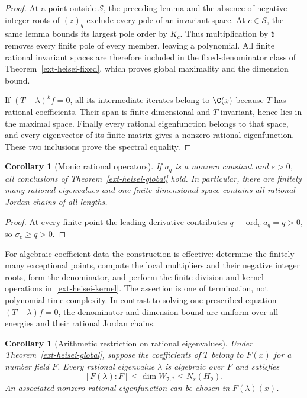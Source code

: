 \documentclass[11pt,a4paper]{article}
\newtheorem{corollary}[theorem]{Corollary}
\theoremstyle{definition}\newtheorem{definition}[theorem]{Definition}
\theoremstyle{remark}\newtheorem{remark}[theorem]{Remark}
\numberwithin{equation}{section}
\begin{document}
\begin{proof}
At a point outside $\mathcal S$, the preceding lemma and the absence of
negative integer roots of $(z)_q$ exclude every pole of an invariant
space.  At $c\in\mathcal S$, the same lemma bounds its largest pole order
by $K_c$.  Thus multiplication by $\mathfrak d$ removes every finite pole
of every member, leaving a polynomial.  All finite rational invariant
spaces are therefore included in the fixed-denominator class of
Theorem~\ref{ext-heisei-fixed}, which proves global maximality and the
dimension bound.

If $(T-\lambda)^k f=0$, all its intermediate iterates belong to $\C(x)$
because $T$ has rational coefficients.  Their span is finite-dimensional
and $T$-invariant, hence lies in the maximal space.  Finally every rational
eigenfunction belongs to that space, and every eigenvector of its finite
matrix gives a nonzero rational eigenfunction.  These two inclusions prove
the spectral equality.
\end{proof}

\begin{corollary}[Monic rational operators]
\label{ext-heisei-monic}
If $a_q$ is a nonzero constant and $s>0$, all conclusions of
Theorem~\ref{ext-heisei-global} hold.  In particular, there are finitely
many rational eigenvalues and one finite-dimensional space contains all
rational Jordan chains of all lengths.
\end{corollary}

\begin{proof}
At every finite point the leading derivative contributes
$q-\operatorname{ord}_c a_q=q>0$, so $\sigma_c\ge q>0$.
\end{proof}

For algebraic coefficient data the construction is effective: determine the
finitely many exceptional points, compute the local multipliers and their
negative integer roots, form the denominator, and perform the finite
division and kernel operations in~\eqref{ext-heisei-kernel}.  The assertion
is one of termination, not polynomial-time complexity.  In contrast to
solving one prescribed equation $(T-\lambda)f=0$, the denominator and
dimension bound are uniform over all energies and their rational Jordan
chains.

\begin{corollary}[Arithmetic restriction on rational eigenvalues]
\label{ext-heisei-arithmetic}
Under Theorem~\ref{ext-heisei-global}, suppose the coefficients of $T$
belong to $F(x)$ for a number field $F$.  Every rational eigenvalue
$\lambda$ is algebraic over $F$ and satisfies
\[
 [F(\lambda):F]\le \dim W_{\mathfrak d,*}
       \le N_s(H_{\mathfrak d}).
\]
An associated nonzero rational eigenfunction can be chosen in
$F(\lambda)(x)$.
\end{corollary}
\end{document}
